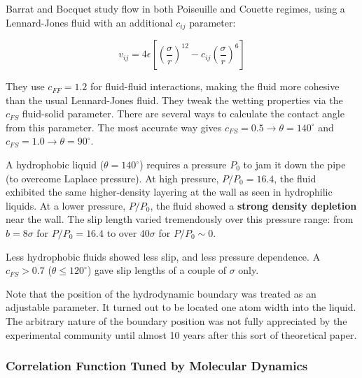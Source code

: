 \documentclass[12pt, a4paper, twoside, openright]{book}
\begin{document}
\vspace*{1em}

Barrat and Bocquet \cite{BarratBocquet1999} study flow in both Poiseuille and  Couette regimes, using a Lennard-Jones fluid with an additional $c_{ij}$ parameter:

\begin{equation}
v_{ij} = 4 \epsilon \left[ \left( \frac{\sigma}{r}\right)^{12}
 - c_{ij} \left( \frac{\sigma}{r} \right)^{6} \right]
\end{equation}


They use $c_{FF} = 1.2$ for fluid-fluid interactions, making the fluid more cohesive than the usual Lennard-Jones fluid. They tweak the wetting properties via the $c_{FS}$ fluid-solid parameter.  There are several ways to calculate the contact angle from this parameter.  The most accurate way gives $c_{FS}=0.5 \rightarrow \theta= 140^{\circ}$ and $c_{FS} = 1.0 \rightarrow \theta = 90^{\circ}$.

A hydrophobic liquid ($\theta = 140^{\circ}$) requires a pressure $P_{0}$ to jam it down the pipe (to overcome Laplace pressure). At high pressure, $P/P_{0}=16.4$, the fluid exhibited the same higher-density layering at the wall as seen in hydrophilic liquids.  At a lower pressure, $P/P_{0}$, the fluid showed a \textbf{strong density depletion} near the wall.  The slip length varied tremendously over this pressure range: from $b = 8\sigma$ for $P/P_{0} = 16.4$ to over $40\sigma$ for $P/P_{0} \sim 0$.

Less hydrophobic fluids showed less slip, and less pressure dependence. A $c_{FS}>0.7$ ($\theta \leq 120^{\circ}$) gave slip lengths of a couple of $\sigma$ only.

Note that the position of the hydrodynamic boundary was treated as an adjustable parameter.  It turned out to be located one atom width into the liquid.  The arbitrary nature of the boundary position was not fully appreciated by the experimental community until almost 10 years after this sort of theoretical paper.

\subsubsection*{Correlation Function Tuned by Molecular Dynamics}
\end{document}
